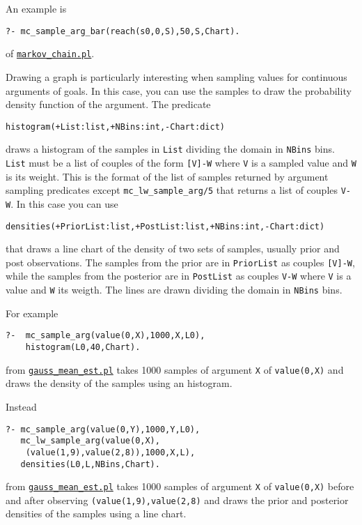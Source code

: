 An example is
\begin{verbatim}
?- mc_sample_arg_bar(reach(s0,0,S),50,S,Chart). 
\end{verbatim}
of \href{http://cplint.lamping.unife.it/example/inference/markov_chain.pl}{\texttt{markov\_chain.pl}}.

Drawing a graph is particularly interesting when
sampling values for continuous arguments of goals.
In this case, you can use the samples to draw the
probability density function of the argument.
The predicate
\begin{verbatim}
histogram(+List:list,+NBins:int,-Chart:dict) 
\end{verbatim}
draws a histogram of the samples in \verb|List| dividing the domain in
 \verb|NBins| bins.
\verb|List| must be a list of couples of the form \verb|[V]-W|
where \verb|V| is a sampled value and \verb|W| is its weight. This is the format of the list of samples returned by argument sampling predicates
except \verb|mc_lw_sample_arg/5| that returns a list of couples \verb|V-W|. 
In this case you can
use
\begin{verbatim}
densities(+PriorList:list,+PostList:list,+NBins:int,-Chart:dict)
\end{verbatim}
that draws a line chart of the density of two sets of samples, usually
 prior and post observations. The samples from the prior are in \verb|PriorList|
as couples \verb|[V]-W|, while the samples from the posterior are in \verb|PostList|
as couples \verb|V-W| where \verb|V| is a value and \verb|W| its weigth.
 The lines are drawn dividing the domain in
 \verb|NBins| bins.
 
For example
\begin{verbatim}
?-  mc_sample_arg(value(0,X),1000,X,L0),
    histogram(L0,40,Chart).
\end{verbatim}
from \href{http://cplint.lamping.unife.it/example/inference/gauss_mean_est.pl}{\texttt{gauss\_mean\_est.pl}}
takes 1000 samples of argument \verb|X| of \verb|value(0,X)| and draws the density of the samples using an histogram.

Instead
\begin{verbatim}
?- mc_sample_arg(value(0,Y),1000,Y,L0),
   mc_lw_sample_arg(value(0,X),
    (value(1,9),value(2,8)),1000,X,L),
   densities(L0,L,NBins,Chart).
\end{verbatim}
from \href{http://cplint.lamping.unife.it/example/inference/gauss_mean_est.pl}{\texttt{gauss\_mean\_est.pl}}
takes 1000 samples of argument \verb|X| of \verb|value(0,X)| before and after observing
\verb|(value(1,9),value(2,8)| and draws the prior and posterior densities of the samples using a line chart.
